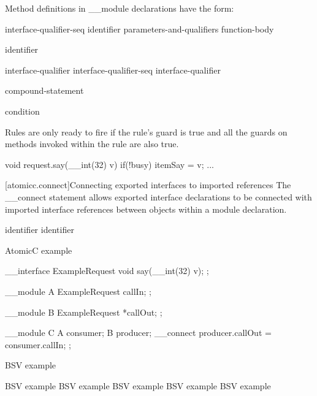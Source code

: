 \pnum
Method definitions in __module declarations have the form:

\begin{bnf}
\br
     interface-qualifier-seq identifier parameters-and-qualifiers function-body
\end{bnf}

\begin{bnf}
\br
    identifier 

 \br
    interface-qualifier \br
    interface-qualifier-seq interface-qualifier
\end{bnf}

\begin{bnf}
\br
     compound-statement

\br
     condition \terminal{)}

\end{bnf}


Rules are only ready to fire if the rule's guard is true and all the
guards on methods invoked within the rule are also true.

\begin{codeblock}
         void request.say(__int(32) v) if(!busy) {
             itemSay = v;
             ...
         }
\end{codeblock}

[atomicc.connect]{Connecting exported interfaces to imported references}
The __connect statement allows exported interface declarations to be connected
with imported interface references between objects within a module declaration.

\begin{bnf}
\br
     identifier \terminal{=} identifier \terminal{;}
\end{bnf}

\begin{example}
\begin{multicols}{2}
AtomicC example
\begin{codeblock}
     __interface ExampleRequest {
         void say(__int(32) v);
     };

     __module A {
          ExampleRequest callIn;
     };

     __module B {
         ExampleRequest *callOut;
     };

     __module C {
         A consumer;
         B producer;
         __connect producer.callOut = consumer.callIn;
     };
\end{codeblock}
\columnbreak
BSV example
\begin{codeblock}
    BSV example
    BSV example
    BSV example
    BSV example
    BSV example
\end{codeblock}
\end{multicols}
\end{example}

